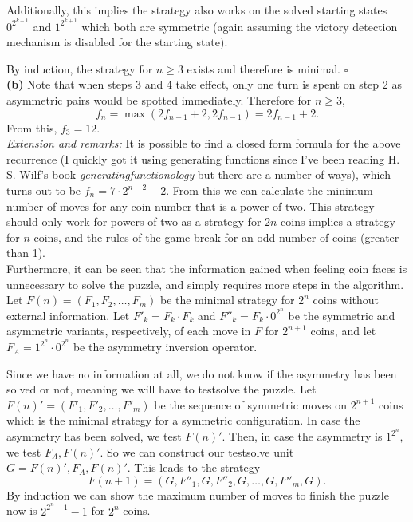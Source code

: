\documentclass{article}
\begin{document}
    Additionally, this implies the strategy also works on the solved starting states $0^{2^{k + 1}}$ and $1^{2^{k + 1}}$ which both are symmetric (again assuming the victory detection mechanism is disabled for the starting state).

    By induction, the strategy for $n\geq 3$ exists and therefore is minimal. $\square$ \\

    \textbf{(b)} Note that when steps 3 and 4 take effect, only one turn is spent on step 2 as asymmetric pairs would be spotted immediately. Therefore for $n \geq 3$, $$f_n = \max(2f_{n - 1} + 2, 2f_{n - 1}) = 2f_{n - 1} + 2.$$ From this, $f_3 = 12.$ \\

    \textit{Extension and remarks:} It is possible to find a closed form formula for the above recurrence (I quickly got it using generating functions since I've been reading H. S. Wilf's book \textit{generatingfunctionology} but there are a number of ways), which turns out to be $f_n = 7\cdot 2^{n - 2} - 2.$ From this we can calculate the minimum number of moves for any coin number that is a power of two. This strategy should only work for powers of two as a strategy for $2n$ coins implies a strategy for $n$ coins, and the rules of the game break for an odd number of coins (greater than 1).\\

    Furthermore, it can be seen that the information gained when feeling coin faces is unnecessary to solve the puzzle, and simply requires more steps in the algorithm. Let $F(n) = (F_1, F_2, \dots, F_m)$ be the minimal strategy for $2^n$ coins without external information. Let $F'_k = F_k\cdot F_k$ and $F''_k = F_k\cdot 0^{2^n}$ be the symmetric and asymmetric variants, respectively, of each move in $F$ for $2^{n + 1}$ coins, and let $F_A = 1^{2^n}\cdot 0^{2^n}$ be the asymmetry inversion operator. 
    
    Since we have no information at all, we do not know if the asymmetry has been solved or not, meaning we will have to testsolve the puzzle. Let $F(n)' = (F'_1, F'_2,\dots, F'_m)$ be the sequence of symmetric moves on $2^{n + 1}$ coins which is the minimal strategy for a symmetric configuration. In case the asymmetry has been solved, we test $F(n)'$. Then, in case the asymmetry is $1^{2^n},$ we test $F_A, F(n)'$. So we can construct our testsolve unit $G = F(n)', F_A, F(n)'$. This leads to the strategy
    $$F(n + 1) = (G, F''_1, G, F''_2, G, \dots, G, F''_m, G).$$
    By induction we can show the maximum number of moves to finish the puzzle now is $2^{2^n - 1} - 1$ for $2^n$ coins.\\
\end{document}
